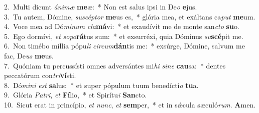 {2.~}Multi dicunt \textit{á}\textit{ni}\textit{mæ} \textbf{me}æ:~* Non est salus ipsi in De\textit{o} \textbf{e}jus.\\
{3.~}Tu autem, Dómine, \textit{su}\textit{scép}\textit{tor} \textbf{me}us es,~* glória mea, et exáltans ca\textit{put} \textbf{me}um.\\
{4.~}Voce mea ad Dó\textit{mi}\textit{num} \textit{cla}\textbf{má}vi:~* et exaudívit me de monte san\textit{cto} \textbf{su}o.\\
{5.~}Ego dormívi, \textit{et} \textit{so}\textit{po}\textbf{rá}tus sum:~* et exsurréxi, quia Dóminus \textit{su}\textbf{scé}pit me.\\
{6.~}Non timébo míllia pópu\textit{li} \textit{cir}\textit{cum}\textbf{dán}tis me:~* exsúrge, Dómine, salvum me fac, De\textit{us} \textbf{me}us.\\
{7.~}Quóniam tu percussísti omnes adversántes mi\textit{hi} \textit{si}\textit{ne} \textbf{cau}sa:~* dentes peccatórum con\textit{tri}\textbf{ví}sti.\\
{8.~}Dó\textit{mi}\textit{ni} \textit{est} \textbf{sa}lus:~* et super pópulum tuum benedícti\textit{o} \textbf{tu}a.\\
{9.~}Glória \textit{Pa}\textit{tri}, \textit{et} \textbf{Fí}lio,~* et Spirítu\textit{i} \textbf{San}cto.\\
{10.~}Sicut erat in princípio, \textit{et} \textit{nunc}, \textit{et} \textbf{sem}per,~* et in sǽcula sæculó\textit{rum}. \textbf{A}men.\\
